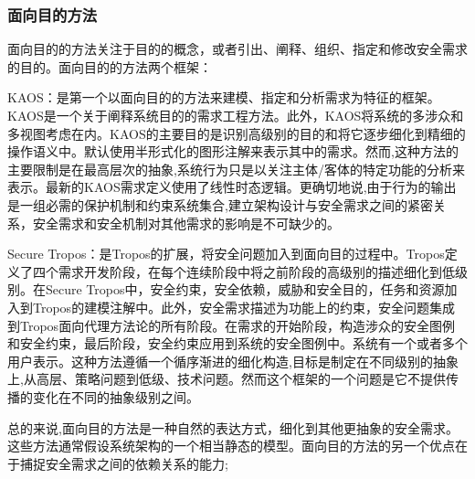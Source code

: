 \subsubsection{面向目的方法}
\par
面向目的的方法关注于目的的概念，或者引出、阐释、组织、指定和修改安全需求的目的。面向目的的方法两个框架：
\par
KAOS：是第一个以面向目的的方法来建模、指定和分析需求为特征的框架。KAOS是一个关于阐释系统目的的需求工程方法。此外，KAOS将系统的多涉众和多视图考虑在内。KAOS的主要目的是识别高级别的目的和将它逐步细化到精细的操作语义中。默认使用半形式化的图形注解来表示其中的需求。然而,这种方法的主要限制是在最高层次的抽象,系统行为只是以关注主体/客体的特定功能的分析来表示。最新的KAOS需求定义使用了线性时态逻辑。更确切地说,由于行为的输出是一组必需的保护机制和约束系统集合,建立架构设计与安全需求之间的紧密关系，安全需求和安全机制对其他需求的影响是不可缺少的。
\par
Secure Tropos：是Tropos的扩展，将安全问题加入到面向目的过程中。Tropos定义了四个需求开发阶段，在每个连续阶段中将之前阶段的高级别的描述细化到低级别。在Secure Tropos中，安全约束，安全依赖，威胁和安全目的，任务和资源加入到Tropos的建模注解中。此外，安全需求描述为功能上的约束，安全问题集成到Tropos面向代理方法论的所有阶段。在需求的开始阶段，构造涉众的安全图例和安全约束，最后阶段，安全约束应用到系统的安全图例中。系统有一个或者多个用户表示。这种方法遵循一个循序渐进的细化构造,目标是制定在不同级别的抽象上,从高层、策略问题到低级、技术问题。然而这个框架的一个问题是它不提供传播的变化在不同的抽象级别之间。
\par
总的来说,面向目的方法是一种自然的表达方式，细化到其他更抽象的安全需求。这些方法通常假设系统架构的一个相当静态的模型。面向目的方法的另一个优点在于捕捉安全需求之间的依赖关系的能力;

